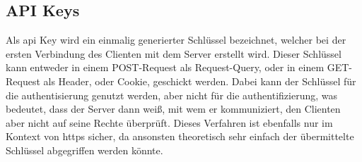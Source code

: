 \subsection{API Keys}\label{subsec:api-keys}
	Als \gls{api} Key wird ein einmalig generierter Schlüssel bezeichnet,
	welcher bei der ersten Verbindung des Clienten mit dem Server erstellt wird.
	Dieser Schlüssel kann entweder in einem POST-Request als Request-Query,
	oder in einem GET-Request als Header,
	oder Cookie,
	geschickt werden.
	Dabei kann der Schlüssel für die \gls{authentisierung} genutzt werden,
	aber nicht für die \gls{authentifizierung},
	was bedeutet,
	dass der Server dann weiß,
	mit wem er kommuniziert,
	den Clienten aber nicht auf seine Rechte überprüft.
	Dieses Verfahren ist ebenfalls nur im Kontext von \gls{https} sicher,
	da ansonsten theoretisch sehr einfach der übermittelte Schlüssel abgegriffen werden könnte.

